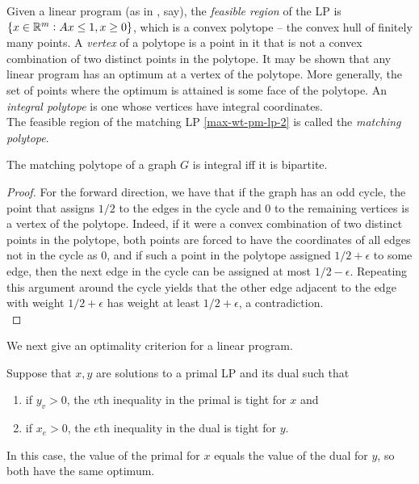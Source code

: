 	Given a linear program (as in , say), the \emph{feasible region} of the LP is $\{x \in \mathbb{R}^m : Ax \le 1, x \ge 0\}$, which is a convex polytope -- the convex hull of finitely many points. A \emph{vertex} of a polytope is a point in it that is not a convex combination of two distinct points in the polytope. It may be shown that any linear program has an optimum at a vertex of the polytope. More generally, the set of points where the optimum is attained is some face of the polytope. An \emph{integral polytope} is one whose vertices have integral coordinates.\\

	The feasible region of the matching LP \eqref{max-wt-pm-lp-2} is called the \emph{matching polytope}.

	\begin{fdef}
		The matching polytope of a graph $G$ is integral iff it is bipartite.
	\end{fdef}
	\begin{proof}
		For the forward direction, we have that if the graph has an odd cycle, the point that assigns $1/2$ to the edges in the cycle and $0$ to the remaining vertices is a vertex of the polytope. Indeed, if it were a convex combination of two distinct points in the polytope, both points are forced to have the coordinates of all edges not in the cycle as $0$, and if such a point in the polytope assigned $1/2+\epsilon$ to some edge, then the next edge in the cycle can be assigned at most $1/2-\epsilon$. Repeating this argument around the cycle yields that the other edge adjacent to the edge with weight $1/2+\epsilon$ has weight at least $1/2+\epsilon$, a contradiction. \\
	\end{proof}

	We next give an optimality criterion for a linear program.

	\begin{flem}
		\label{complementary slackness}
		Suppose that $x,y$ are solutions to a primal LP and its dual such that
		\begin{enumerate}[label=(\alph*)]
			\item if $y_v > 0$, the $v$th inequality in the primal is tight for $x$ and
			\item if $x_e > 0$, the $e$th inequality in the dual is tight for $y$.
		\end{enumerate}
		In this case, the value of the primal for $x$ equals the value of the dual for $y$, so both have the same optimum. 
	\end{flem}

